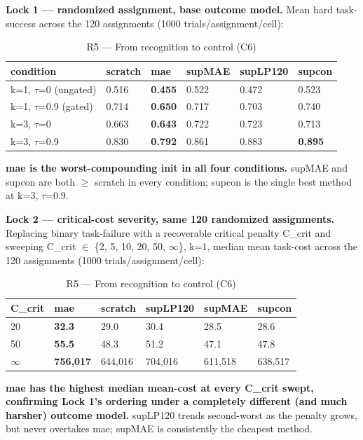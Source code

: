 \textbf{Lock 1 --- randomized assignment, base outcome model.} Mean hard task-success across the 120 assignments (1000 trials/assignment/cell):

\begin{table}[!t]
\centering
\caption{R5 --- From recognition to control (C6)}
\small
\begin{tabular}{llllll}
\toprule
condition & scratch & mae & supMAE & supLP120 & supcon \\
\midrule
k=1, $\tau$=0 (ungated) & 0.516 & \textbf{0.455} & 0.522 & 0.472 & 0.523 \\
k=1, $\tau$=0.9 (gated) & 0.714 & \textbf{0.650} & 0.717 & 0.703 & 0.740 \\
k=3, $\tau$=0 & 0.663 & \textbf{0.643} & 0.722 & 0.723 & 0.713 \\
k=3, $\tau$=0.9 & 0.830 & \textbf{0.792} & 0.861 & 0.883 & \textbf{0.895} \\
\bottomrule
\end{tabular}
\end{table}

\textbf{mae is the worst-compounding init in all four conditions.} supMAE and supcon are both $\ge$ scratch in every condition; supcon is the single best method at k=3, $\tau$=0.9.

\textbf{Lock 2 --- critical-cost severity, same 120 randomized assignments.} Replacing binary task-failure with a recoverable critical penalty C\_crit and sweeping C\_crit $\in$ \{2, 5, 10, 20, 50, $\infty$\}, k=1, median mean task-cost across the 120 assignments (1000 trials/assignment/cell):

\begin{table}[!t]
\centering
\caption{R5 --- From recognition to control (C6)}
\small
\begin{tabular}{llllll}
\toprule
C\_crit & mae & scratch & supLP120 & supMAE & supcon \\
\midrule
20 & \textbf{32.3} & 29.0 & 30.4 & 28.5 & 28.6 \\
50 & \textbf{55.5} & 48.3 & 51.2 & 47.1 & 47.8 \\
$\infty$ & \textbf{756,017} & 644,016 & 704,016 & 611,518 & 638,517 \\
\bottomrule
\end{tabular}
\end{table}

\textbf{mae has the highest median mean-cost at every C\_crit swept, confirming Lock 1's ordering under a completely different (and much harsher) outcome model.} supLP120 trends second-worst as the penalty grows, but never overtakes mae; supMAE is consistently the cheapest method.

